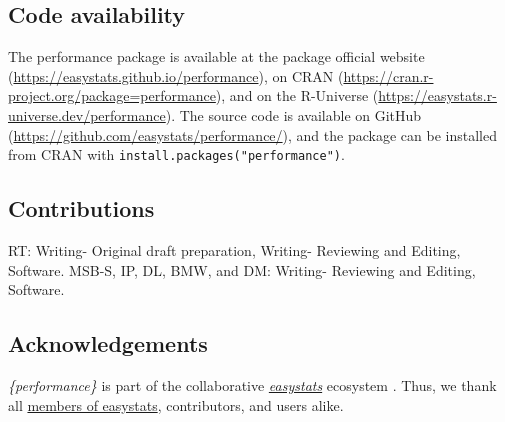 \documentclass[sn-basic, lineno,pdflatex]{sn-jnl}
\begin{document}
\subsection{Code availability}\label{code-availability}

The performance package is available at the package official website
(\url{https://easystats.github.io/performance}), on CRAN
(\url{https://cran.r-project.org/package=performance}), and on the
R-Universe (\url{https://easystats.r-universe.dev/performance}). The
source code is available on GitHub
(\url{https://github.com/easystats/performance/}), and the package can
be installed from CRAN with \texttt{install.packages("performance")}.

\subsection{Contributions}\label{contributions}

RT: Writing- Original draft preparation, Writing- Reviewing and Editing,
Software. MSB-S, IP, DL, BMW, and DM: Writing- Reviewing and Editing,
Software.

\subsection{Acknowledgements}\label{acknowledgements}

\emph{\{performance\}} is part of the collaborative
\href{https://github.com/easystats/easystats}{\emph{easystats}}
ecosystem \citep{easystatspackage}. Thus, we thank all
\href{https://github.com/orgs/easystats/people}{members of easystats},
contributors, and users alike.

\renewcommand\refname{References}

\end{document}
